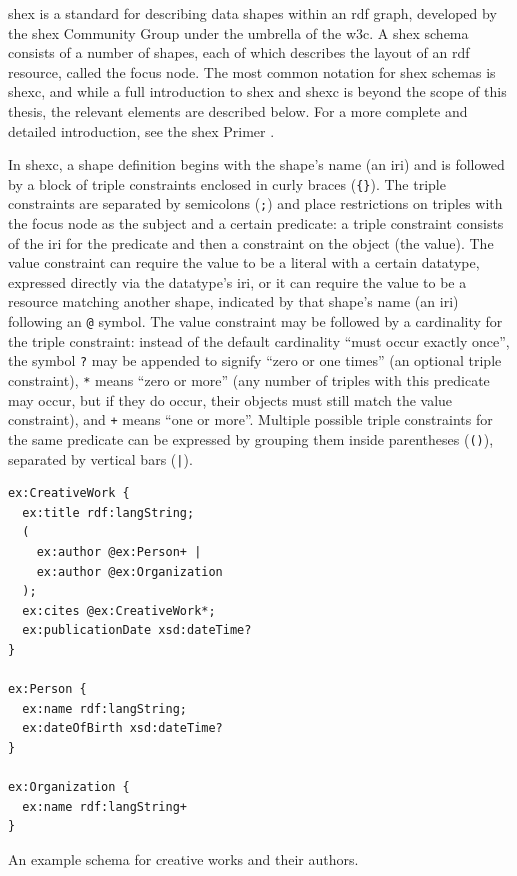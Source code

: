 
\acrfull{shex} \cite{shex}
is a standard for describing data shapes within an \gls{rdf} graph,
developed by the \gls{shex} Community Group under the umbrella of the \gls{w3c}.
A \gls{shex} \gls{schema} consists of a number of \glspl{shape},
each of which describes the layout of an \gls{rdf} \gls{resource},
called the \gls{focus node}.
The most common notation for \gls{shex} \glspl{schema} is \gls{shexc}, %
and while a full introduction to \gls{shex} and \gls{shexc} is beyond the scope of this thesis,
the relevant elements are described below.
For a more complete and detailed introduction,
see the \gls{shex} Primer \cite{shex-primer}.

In \gls{shexc}, a \gls{shape} definition begins with the \gls{shape}’s name (an \gls{iri})
and is followed by a block of \glspl{triple constraint} enclosed in curly braces (\lstinline!{}!).
The \glspl{triple constraint} are separated by semicolons (\lstinline{;})
and place restrictions on \glspl{triple} with the \gls{focus node} as the \gls{subject} and a certain \gls{predicate}:
a \gls{triple constraint} consists of the \gls{iri} for the \gls{predicate} and then a constraint on the \gls{object} (the value).
The value constraint can require the value to be a literal with a certain datatype,
expressed directly via the datatype’s \gls{iri},
or it can require the value to be a \gls{resource} matching another \gls{shape},
indicated by that \gls{shape}’s name (an \gls{iri}) following an \lstinline{@} symbol.
The value constraint may be followed by a cardinality for the \gls{triple constraint}:
instead of the default cardinality “must occur exactly once”,
the symbol \lstinline{?} may be appended to signify “zero or one times”
(an optional \gls{triple constraint}),
\lstinline{*} means “zero or more”
(any number of \glspl{triple} with this \gls{predicate} may occur,
but if they do occur, their \glspl{object} must still match the \gls{value constraint}),
and \lstinline{+} means “one or more”.
Multiple possible \glspl{triple constraint} for the same \gls{predicate} can be expressed
by grouping them inside parentheses (\lstinline{()}), separated by vertical bars (\lstinline{|}).

\begin{lstfloat}
\begin{lstlisting}[language=sparql]
ex:CreativeWork {
  ex:title rdf:langString;
  (
    ex:author @ex:Person+ |
    ex:author @ex:Organization
  );
  ex:cites @ex:CreativeWork*;
  ex:publicationDate xsd:dateTime?
}

ex:Person {
  ex:name rdf:langString;
  ex:dateOfBirth xsd:dateTime?
}

ex:Organization {
  ex:name rdf:langString+
}
\end{lstlisting}
\caption{An example \gls{schema} for creative works and their authors.}
\label{listing:shex-example}
\end{lstfloat}

